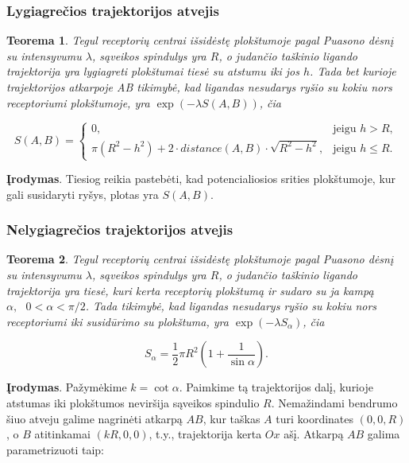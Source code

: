 \documentclass[10pt]{article}
\newtheorem{thm}{Teorema}
\begin{document}
\subsubsection{Lygiagrečios trajektorijos atvejis}

\begin{thm}\label{thm:2}
Tegul receptorių centrai išsidėstę plokštumoje  pagal Puasono dėsnį su intensyvumu $\lambda$,  sąveikos spindulys yra $R$, o judančio taškinio ligando trajektorija yra lygiagreti plokštumai tiesė su atstumu iki jos  $ h $. Tada bet kurioje trajektorijos atkarpoje AB tikimybė, kad ligandas nesudarys ryšio su kokiu nors receptoriumi plokštumoje, yra $ \exp( -\lambda S(A,B)) $, čia 

\[
S(A,B) =
\begin{cases}
0, & \text{jeigu } h>R, \\

\pi(R^2-h^2) + 2 \cdot distance(A,B) \cdot \sqrt{R^2-h^2}, & 
 \text{jeigu }  h \leqslant R.

\end{cases}
\]

\end{thm}

\textbf{Įrodymas}. Tiesiog reikia pastebėti, kad potencialiosios srities plokštumoje, kur gali susidaryti ryšys, plotas yra $ S(A,B) $.



\subsubsection{Nelygiagrečios trajektorijos atvejis}

\begin{thm}\label{thm:3}
Tegul receptorių centrai išsidėstę plokštumoje  pagal Puasono dėsnį su intensyvumu $\lambda$,  sąveikos spindulys yra $R$, o judančio taškinio ligando trajektorija yra  tiesė, kuri kerta receptorių plokštumą ir sudaro su ja kampą $\alpha, \mbox{ } 0 < \alpha < \pi/2 $. Tada  tikimybė, kad ligandas nesudarys ryšio su kokiu nors receptoriumi  iki susidūrimo su plokštuma, yra $ \exp( -\lambda S_{\alpha}) $, čia 

\[
S_{\alpha} = \frac{1}{2} \pi R^2 \left(1 + \frac{1}{\sin \alpha } \right).
\]
\end{thm}

\textbf{Įrodymas}. Pažymėkime $ k = \cot \alpha $. Paimkime tą trajektorijos dalį, kurioje atstumas iki plokštumos neviršija sąveikos spindulio  $ R $. Nemažindami bendrumo šiuo atveju galime nagrinėti atkarpą $ AB $, kur taškas $ A $ turi koordinates $ (0,0,R) $, o $ B $ atitinkamai  $ (kR,0,0) $, t.y., trajektorija kerta $ Ox $ ašį. Atkarpą  $ AB $ galima parametrizuoti taip:
\end{document}
